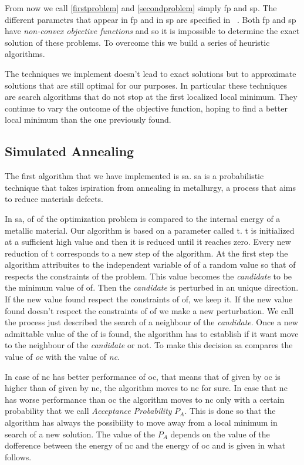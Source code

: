 \documentclass[journal]{IEEEtran}
\begin{document}
From now we call \ref{firstproblem} and \ref{secondproblem} simply \gls{fp} and \gls{sp}. The different parametrs that appear in \gls{fp} and in \gls{sp} are specified in ~\cite{Lin2007}. Both \gls{fp} and \gls{sp} have \textit{non-convex objective functions} and so it is impossible to determine the exact solution of these problems. To overcome this we build a series of heuristic algorithms.

The techniques we implement doesn't lead to exact solutions but to approximate solutions that are still optimal for our purposes. In particular these techniques are search algorithms that do not stop at the first localized local minimum. They continue to vary the outcome of the objective function, hoping to find a better local minimum than the one previously found.

\subsection{Simulated Annealing}
The first algorithm that we have implemented is \gls{sa}. \gls{sa} is a probabilistic technique that takes ispiration from annealing in metallurgy, a process that aims to reduce materials defects.

In \gls{sa}, \gls{of} of the optimization problem is compared to the internal energy of a metallic material. Our algorithm is based on a parameter called \gls{t}. \gls{t} is initialized at a sufficient high value and then it is reduced until it reaches zero. Every new reduction of \gls{t} corresponds to a new step of the algorithm. At the first step the algorithm attribuites to the independent variable of \gls{of} a random value so that \gls{of} respects the constraints of the problem. This value becomes the \textit{candidate} to be the minimum value of \gls{of}. Then the \textit{candidate} is perturbed in an unique direction. If the new value found respect the constraints of \gls{of}, we keep it. If the new value found doesn't respect the constraints of \gls{of} we make a new perturbation. We call the process just described the search of a neighbour of the \textit{candidate}. Once a new admittable value of the \gls{of} is found, the algorithm has to establish if it want move to the neighbour of the \textit{candidate} or not. To make this decision \gls{sa} compares the value of \textit{oc} with the value of \textit{nc}.

 In case of \gls{nc} has better performance of \gls{oc}, that means that \gls{of} given by \gls{oc} is higher than \gls{of} given by \gls{nc}, the algorithm moves to \gls{nc} for sure. In case that \gls{nc} has worse performance than \gls{oc} the algorithm moves to \gls{nc} only with a certain probability that we call \textit{Acceptance Probability} $P_A$. This is done so that the algorithm has always the possibility to move away from a local minimum in search of a new solution. The value of the $P_A$ depends on the value of the dofference between the energy of \gls{nc} and the energy of \gls{oc} and is given in what follows.
\end{document}
